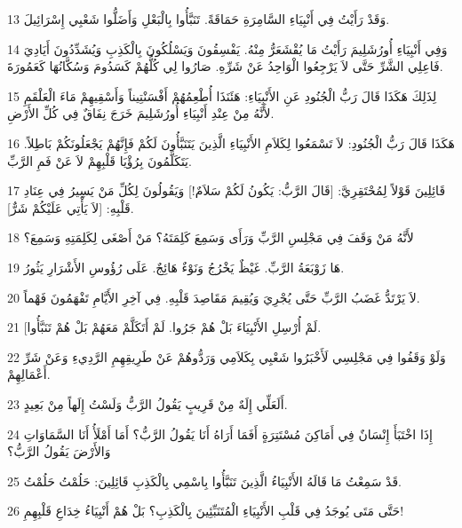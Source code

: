 \par 13 وَقَدْ رَأَيْتُ فِي أَنْبِيَاءِ السَّامِرَةِ حَمَاقَةً. تَنَبَّأُوا بِالْبَعْلِ وَأَضَلُّوا شَعْبِي إِسْرَائِيلَ.
\par 14 وَفِي أَنْبِيَاءِ أُورُشَلِيمَ رَأَيْتُ مَا يُقْشَعَرُّ مِنْهُ. يَفْسِقُونَ وَيَسْلُكُونَ بِالْكَذِبِ وَيُشَدِّدُونَ أَيَادِيَ فَاعِلِي الشَّرِّ حَتَّى لاَ يَرْجِعُوا الْوَاحِدُ عَنْ شَرِّهِ. صَارُوا لِي كُلُّهُمْ كَسَدُومَ وَسُكَّانُهَا كَعَمُورَةَ.
\par 15 لِذَلِكَ هَكَذَا قَالَ رَبُّ الْجُنُودِ عَنِ الأَنْبِيَاءِ: هَئَنَذَا أُطْعِمُهُمْ أَفْسَنْتِيناً وَأَسْقِيهِمْ مَاءَ الْعَلْقَمِ لأَنَّهُ مِنْ عِنْدِ أَنْبِيَاءِ أُورُشَلِيمَ خَرَجَ نِفَاقٌ فِي كُلِّ الأَرْضِ.
\par 16 هَكَذَا قَالَ رَبُّ الْجُنُودِ: لاَ تَسْمَعُوا لِكَلاَمِ الأَنْبِيَاءِ الَّذِينَ يَتَنَبَّأُونَ لَكُمْ فَإِنَّهُمْ يَجْعَلُونَكُمْ بَاطِلاً. يَتَكَلَّمُونَ بِرُؤْيَا قَلْبِهِمْ لاَ عَنْ فَمِ الرَّبِّ.
\par 17 قَائِلِينَ قَوْلاً لِمُحْتَقِرِيَّ: [قَالَ الرَّبُّ: يَكُونُ لَكُمْ سَلاَمٌ!] وَيَقُولُونَ لِكُلِّ مَنْ يَسِيرُ فِي عِنَادِ قَلْبِهِ: [لاَ يَأْتِي عَلَيْكُمْ شَرٌّ].
\par 18 لأَنَّهُ مَنْ وَقَفَ فِي مَجْلِسِ الرَّبِّ وَرَأَى وَسَمِعَ كَلِمَتَهُ؟ مَنْ أَصْغَى لِكَلِمَتِهِ وَسَمِعَ؟
\par 19 هَا زَوْبَعَةُ الرَّبِّ. غَيْظٌ يَخْرُجُ وَنَوْءٌ هَائِجٌ. عَلَى رُؤُوسِ الأَشْرَارِ يَثُورُ.
\par 20 لاَ يَرْتَدُّ غَضَبُ الرَّبِّ حَتَّى يُجْرِيَ وَيُقِيمَ مَقَاصِدَ قَلْبِهِ. فِي آخِرِ الأَيَّامِ تَفْهَمُونَ فَهْماً.
\par 21 [لَمْ أُرْسِلِ الأَنْبِيَاءَ بَلْ هُمْ جَرُوا. لَمْ أَتَكَلَّمْ مَعَهُمْ بَلْ هُمْ تَنَبَّأُوا.
\par 22 وَلَوْ وَقَفُوا فِي مَجْلِسِي لَأَخْبَرُوا شَعْبِي بِكَلاَمِي وَرَدُّوهُمْ عَنْ طَرِيقِهِمِ الرَّدِيءِ وَعَنْ شَرِّ أَعْمَالِهِمْ.
\par 23 أَلَعَلِّي إِلَهٌ مِنْ قَرِيبٍ يَقُولُ الرَّبُّ وَلَسْتُ إِلَهاً مِنْ بَعِيدٍ.
\par 24 إِذَا اخْتَبَأَ إِنْسَانٌ فِي أَمَاكِنَ مُسْتَتِرَةٍ أَفَمَا أَرَاهُ أَنَا يَقُولُ الرَّبُّ؟ أَمَا أَمْلَأُ أَنَا السَّمَاوَاتِ وَالأَرْضَ يَقُولُ الرَّبُّ؟
\par 25 قَدْ سَمِعْتُ مَا قَالَهُ الأَنْبِيَاءُ الَّذِينَ تَنَبَّأُوا بِاسْمِي بِالْكَذِبِ قَائِلِينَ: حَلُمْتُ حَلُمْتُ.
\par 26 حَتَّى مَتَى يُوجَدُ فِي قَلْبِ الأَنْبِيَاءِ الْمُتَنَبِّئِينَ بِالْكَذِبِ؟ بَلْ هُمْ أَنْبِيَاءُ خِدَاعِ قَلْبِهِمِ!
